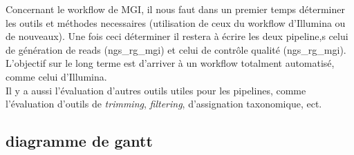 Concernant le workflow de MGI, il nous faut dans un premier temps déterminer les outils et méthodes necessaires (utilisation de ceux du workflow d'Illumina ou de nouveaux). Une fois ceci déterminer il restera à écrire les deux pipeline,s celui de génération de reads (ngs\_rg\_mgi) et celui de contrôle qualité (ngs\_rg\_mgi). L'objectif sur le long terme est d'arriver à un workflow totalment automatisé, comme celui d'Illumina.\\

Il y a aussi l'évaluation d'autres outils utiles pour les pipelines, comme l'évaluation d'outils de \emph{trimming}, \emph{filtering}, d'assignation taxonomique, ect.

\newpage
\subsection{diagramme de gantt}
